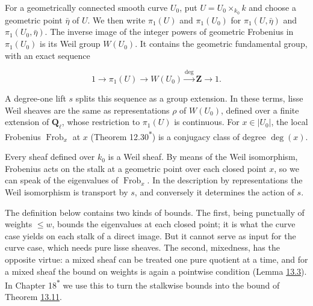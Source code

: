 \documentclass[11pt]{article}
\newcommand{\bpout}[1]{#1\textsuperscript{\hyperlink{bp-outside}{\ensuremath{\ast}}}}
\begin{document}
For a geometrically connected smooth curve \(U_0\), put \(U=U_0\times_{k_0}k\) and choose a geometric point \(\bar\eta\) of \(U\). We then write \(\pi_1(U)\) and \(\pi_1(U_0)\) for \(\pi_1(U,\bar\eta)\) and \(\pi_1(U_0,\bar\eta)\).  The inverse image of the integer powers of geometric Frobenius in \(\pi_1(U_0)\) is its Weil group \(W(U_0)\).  It contains the geometric fundamental group, with an exact sequence

\[
1\longrightarrow \pi_1(U)\longrightarrow W(U_0)
\xrightarrow{\deg}\mathbf Z\longrightarrow1.
\]

A degree-one lift \(s\) splits this sequence as a group extension. In these terms, lisse Weil sheaves are the same as representations \(\rho\) of \(W(U_0)\), defined over a finite extension of \(\mathbf Q_\ell\), whose restriction to \(\pi_1(U)\) is continuous. For \(x\in|U_0|\), the local Frobenius \(\operatorname{Frob}_x\) at \(x\) (Theorem \bpout{12.30}) is a conjugacy class of degree \(\deg(x)\).

\label{bp6}%
Every sheaf defined over \(k_0\) is a Weil sheaf. By means of the Weil isomorphism, Frobenius acts on the stalk at a geometric point over each closed point \(x\), so we can speak of the eigenvalues of \(\operatorname{Frob}_x\). In the description by representations the Weil isomorphism is transport by \(s\), and conversely it determines the action of \(s\).

The definition below contains two kinds of bounds. The first, being punctually of weights \(\le w\), bounds the eigenvalues at each closed point; it is what the curve case yields on each stalk of a direct image. But it cannot serve as input for the curve case, which needs pure lisse sheaves. The second, mixedness, has the opposite virtue: a mixed sheaf can be treated one pure quotient at a time, and for a mixed sheaf the bound on weights is again a pointwise condition (Lemma \hyperref[bp12]{13.3}). In Chapter \bpout{18} we use this to turn the stalkwise bounds into the bound of Theorem \hyperref[bp36]{13.11}.
\end{document}
